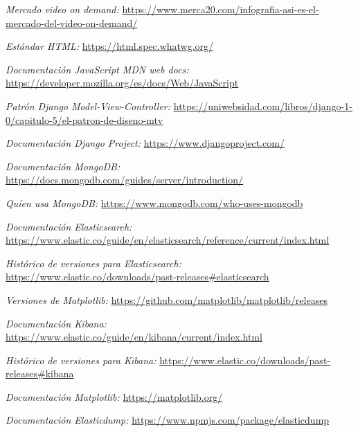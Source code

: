 \documentclass[a4paper, 12pt]{book}
\begin{document}
	\cleardoublepage
	\begin{thebibliography}{7}
		
		\textit{Mercado video on demand:}
		\url{https://www.merca20.com/infografia-asi-es-el-mercado-del-video-on-demand/}
		
		\textit{Estándar HTML:}
		\url{https://html.spec.whatwg.org/}
		
		\textit{Documentación JavaScript MDN web docs:}
		\url{https://developer.mozilla.org/es/docs/Web/JavaScript}	
		
		\textit{Patrón Django Model-View-Controller:}
		\url{https://uniwebsidad.com/libros/django-1-0/capitulo-5/el-patron-de-diseno-mtv}
		
		\textit{Documentación \textit{Django Project}:}
		\url{https://www.djangoproject.com/}
		
		\textit{Documentación MongoDB:}
		\url{https://docs.mongodb.com/guides/server/introduction/}	
		
		\textit{Quíen usa MongoDB:}
		\url{https://www.mongodb.com/who-uses-mongodb}
		
		\textit{Documentación Elasticsearch:}
		\url{https://www.elastic.co/guide/en/elasticsearch/reference/current/index.html}
		
		\textit{Histórico de versiones para Elasticsearch:}
		\url{https://www.elastic.co/downloads/past-releases#elasticsearch}	
		
		\textit{Versiones de Matplotlib:}
		\url{https://github.com/matplotlib/matplotlib/releases}	
		
		\textit{Documentación Kibana:}
		\url{https://www.elastic.co/guide/en/kibana/current/index.html}	
		
		\textit{Histórico de versiones para Kibana:}
		\url{https://www.elastic.co/downloads/past-releases#kibana}	
		
		\textit{Documentación Matplotlib:}
		\url{https://matplotlib.org/}
		
		\textit{Documentación Elasticdump:}
		\url{https://www.npmjs.com/package/elasticdump}	

	\end{thebibliography}
	
\end{document}
